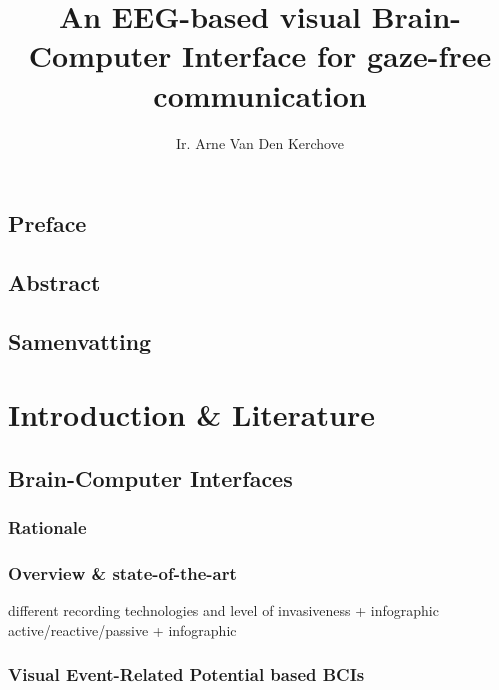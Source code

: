 %
\usepackage{todonotes}
\usepackage{lipsum}

\usepackage[backend=biber]{biblatex}


\title{\sffamily An EEG-based visual Brain-Computer Interface for gaze-free communication}
\author{Ir. Arne Van Den Kerchove}




\frontmatter

\chapter{Preface}
\lipsum[1]
\chapter{Abstract}
\lipsum[2-4]
\chapter{Samenvatting}
\lipsum[5-7]
\tableofcontents
\listoffigures
\listoftables



\mainmatter


\part{Introduction \& Literature}

\chapter{Brain-Computer Interfaces}
\begin{refsection}
\section{Rationale}
\section{Overview \& state-of-the-art}
different recording technologies and level of invasiveness + infographic
active/reactive/passive + infographic
\section{Visual Event-Related Potential based BCIs}
\printbibliography[heading=subbibliography]
\end{refsection}

